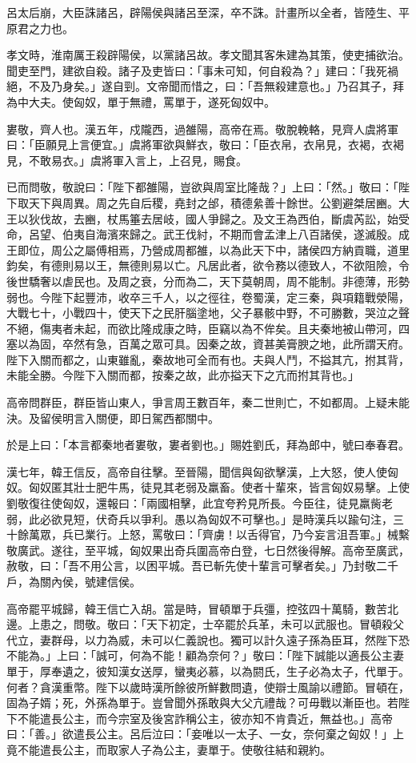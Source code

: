 \begin{pinyinscope}
呂太后崩，大臣誅諸呂，辟陽侯與諸呂至深，卒不誅。計畫所以全者，皆陸生、平原君之力也。

孝文時，淮南厲王殺辟陽侯，以黨諸呂故。孝文聞其客朱建為其策，使吏捕欲治。聞吏至門，建欲自殺。諸子及吏皆曰：「事未可知，何自殺為？」建曰：「我死禍絕，不及乃身矣。」遂自剄。文帝聞而惜之，曰：「吾無殺建意也。」乃召其子，拜為中大夫。使匈奴，單于無禮，罵單于，遂死匈奴中。

婁敬，齊人也。漢五年，戍隴西，過雒陽，高帝在焉。敬脫輓輅，見齊人虞將軍曰：「臣願見上言便宜。」虞將軍欲與鮮衣，敬曰：「臣衣帛，衣帛見，衣褐，衣褐見，不敢易衣。」虞將軍入言上，上召見，賜食。

已而問敬，敬說曰：「陛下都雒陽，豈欲與周室比隆哉？」上曰：「然。」敬曰：「陛下取天下與周異。周之先自后稷，堯封之邰，積德絫善十餘世。公劉避桀居豳。大王以狄伐故，去豳，杖馬箠去居岐，國人爭歸之。及文王為西伯，斷虞芮訟，始受命，呂望、伯夷自海濱來歸之。武王伐紂，不期而會孟津上八百諸侯，遂滅殷。成王即位，周公之屬傅相焉，乃營成周都雒，以為此天下中，諸侯四方納貢職，道里鈞矣，有德則易以王，無德則易以亡。凡居此者，欲令務以德致人，不欲阻險，令後世驕奢以虐民也。及周之衰，分而為二，天下莫朝周，周不能制。非德薄，形勢弱也。今陛下起豐沛，收卒三千人，以之徑往，卷蜀漢，定三秦，與項籍戰滎陽，大戰七十，小戰四十，使天下之民肝腦塗地，父子暴骸中野，不可勝數，哭泣之聲不絕，傷夷者未起，而欲比隆成康之時，臣竊以為不侔矣。且夫秦地被山帶河，四塞以為固，卒然有急，百萬之眾可具。因秦之故，資甚美膏腴之地，此所謂天府。陛下入關而都之，山東雖亂，秦故地可全而有也。夫與人鬥，不搤其亢，拊其背，未能全勝。今陛下入關而都，按秦之故，此亦搤天下之亢而拊其背也。」

高帝問群臣，群臣皆山東人，爭言周王數百年，秦二世則亡，不如都周。上疑未能決。及留侯明言入關便，即日駕西都關中。

於是上曰：「本言都秦地者婁敬，婁者劉也。」賜姓劉氏，拜為郎中，號曰奉春君。

漢七年，韓王信反，高帝自往擊。至晉陽，聞信與匈欲擊漢，上大怒，使人使匈奴。匈奴匿其壯士肥牛馬，徒見其老弱及羸畜。使者十輩來，皆言匈奴易擊。上使劉敬復往使匈奴，還報曰：「兩國相擊，此宜夸矜見所長。今臣往，徒見羸胔老弱，此必欲見短，伏奇兵以爭利。愚以為匈奴不可擊也。」是時漢兵以踰句注，三十餘萬眾，兵已業行。上怒，罵敬曰：「齊虜！以舌得官，乃今妄言沮吾軍。」械繫敬廣武。遂往，至平城，匈奴果出奇兵圍高帝白登，七日然後得解。高帝至廣武，赦敬，曰：「吾不用公言，以困平城。吾已斬先使十輩言可擊者矣。」乃封敬二千戶，為關內侯，號建信侯。

高帝罷平城歸，韓王信亡入胡。當是時，冒頓單于兵彊，控弦四十萬騎，數苦北邊。上患之，問敬。敬曰：「天下初定，士卒罷於兵革，未可以武服也。冒頓殺父代立，妻群母，以力為威，未可以仁義說也。獨可以計久遠子孫為臣耳，然陛下恐不能為。」上曰：「誠可，何為不能！顧為奈何？」敬曰：「陛下誠能以適長公主妻單于，厚奉遺之，彼知漢女送厚，蠻夷必慕，以為閼氏，生子必為太子，代單于。何者？貪漢重幣。陛下以歲時漢所餘彼所鮮數問遺，使辯士風諭以禮節。冒頓在，固為子婿；死，外孫為單于。豈曾聞外孫敢與大父亢禮哉？可毋戰以漸臣也。若陛下不能遣長公主，而今宗室及後宮詐稱公主，彼亦知不肯貴近，無益也。」高帝曰：「善。」欲遣長公主。呂后泣曰：「妾唯以一太子、一女，奈何棄之匈奴！」上竟不能遣長公主，而取家人子為公主，妻單于。使敬往結和親約。


\end{pinyinscope}
